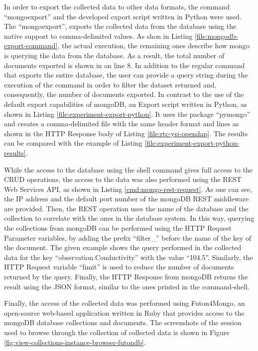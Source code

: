In order to export the collected data to other data formats, the  command
``mongoexport'' and the developed export script written in Python were used.
The ``mongoexport'', exports the collected data from the database using the
native support to comma-delimited values. As shon in Listing
\ref{file:mongodb-export-command}, the actual execution, the remaining ones
describe how mongo is querying the data from the database. As a result, the
total number of documents exported is shown in on line 8. In addition to the
regular command that exports the entire database, the user can provide a query
string during the execution of the command in order to filter the dataset
returned and, consequently, the number of documents exported. In contrast to
the use of the default export capabilities of mongoDB, an Export script written
in Python, as shown in Listing \ref{file:experiment-export-python}. It uses the
package ``pymongo'' and creates a comma-delimited file with the same header
format and lines as shown in the HTTP Response body of Listing
\ref{file:rtc-ysi-opendap}. The results can be compared with the example of
Listing \ref{file:experiment-export-python-results}.

While the access to the database using the shell command gives full access to 
the CRUD operations, the access to the data was also performed using the REST
Web Services API, as shown in Listing \ref{cmd:mongo-rest-request}. As one can
see, the IP address and the default port number of the mongoDB REST middleware
are provided. Then, the REST operation uses the name of the database and
the collection to correlate with the ones in the database system. In this way,
querying the collections from mongoDB can be performed using the HTTP Request
Parameter variables, by adding the prefix ``filter_'' before the name of the
key of the document. The given example shows the query performed in the
collected data for the key ``observation.Conductivity'' with the value
``104.5''. Similarly, the HTTP Request variable ``limit'' is used to reduce
the number of documents returned by the query. Finally, the HTTP Response from
mongoDB returns the result using the JSON format, similar to the ones printed
in the command-shell.

Finally, the access of the collected data was performed using Futon4Mongo,
an open-source web-based application written in Ruby that provides access to the
mongoDB database collections and documents. The screenshots of the session used
to browse through the collection of collected data is shown in Figure
\ref{fig:view-collections-instance-browser-futondb}.

